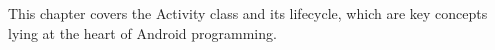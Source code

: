 


This chapter covers the 
Activity class and its lifecycle, which are key concepts lying at the heart of
Android programming.
